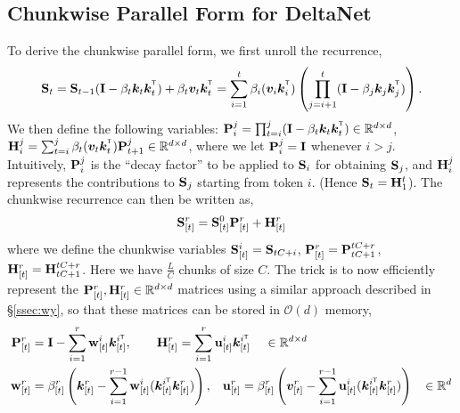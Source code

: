 \subsection{Chunkwise Parallel Form for DeltaNet}
\label{sec:chunk_deltanet}
\vspace{-2mm}
To derive the chunkwise parallel form, we first unroll the recurrence, 
\begin{align}
  \rmS_t 
   = \rmS_{t-1} (\rmI - \beta_t \vk_t \vk_t^\intercal) + \beta_t \vv_t  \vk_t^\intercal 
  = \sum_{i=1}^t  \beta_i (\vv_i \vk_i^\intercal) \left( \prod_{j=i+1}^t  (\rmI - \beta_j \vk_j \vk_j^\intercal) \right). 
\label{eq:unroll}
\end{align}
We then define the following variables: 
$\rmP_{i}^{j} =  \prod_{t=i}^j  (\rmI - \beta_t \vk_t \vk_t^\intercal)  \in \R^{d \times d}$,  $\rmH_{i}^{j} = \sum_{t=i}^j  \beta_t (\vv_t \vk_t^\intercal) \rmP_{t+1}^{j} \in \R^{d \times d}$, where we let ${\mathbf{P}}_{i}^j = {\mathbf{I}}$ whenever $i > j$. Intuitively, ${\mathbf{P}}_{i}^{j}$ is the ``decay factor'' to be applied to ${\mathbf{S}}_{i}$ for obtaining ${\mathbf{S}}_{j}$, and  ${\mathbf{H}}_{i}^{j}$ represents the   contributions to ${\mathbf{S}}_j$ starting from token $i$. (Hence ${\mathbf{S}}_{t} = {\mathbf{H}}_{1}^t$). The chunkwise recurrence  can then  be written as,
\begin{align}
    {\mathbf{S}}_{[t]}^{r} = {\mathbf{S}}_{[t]}^0 {\mathbf{P}}_{[t]}^{r} + {\mathbf{H}}_{[t]}^{r} 
     \label{eq:delta_chunk}
\end{align}
 where we define the chunkwise variables  ${\mathbf{S}}_{[t]}^i = {\mathbf{S}}_{tC + i}$,  $ {\mathbf{P}}_{[t]}^{r} = {\mathbf{P}}_{tC+1}^{tC+r}$, ${\mathbf{H}}_{[t]}^{r} ={\mathbf{H}}_{tC+1}^{tC+r}$.  Here we have $\frac{L}{C}$ chunks of size $C$. 
%
The trick is to now efficiently represent the ${\mathbf{P}}_{[t]}^r, {\mathbf{H}}_{[t]}^r \in \mathbb{R}^{d \times d}$ matrices using a similar approach described in \S\ref{ssec:wy}, so that these matrices can be stored in $\mathcal{O}(d)$ memory,
\begin{align}
    \rmP_{[t]}^{r} &= \rmI - \sum_{i=1}^{r}\vw_{[t]}^i\vk_{[t]}^{i\intercal}  ,\qquad \rmH_{[t]}^{r} = \sum_{i=1}^{r} \vu_{[t]}^i \vk_{[t]}^{i\intercal} \hspace{4mm} \in \R^{d \times d} \label{eq:wy-ph} \\
    \vw_{[t]}^r &= \beta_{[t]}^r \left(\vk_{[t]}^r -  \sum_{i=1}^{r-1} \vw_{[t]}^i (\vk_{[t]}^{i\intercal}\vk_{[t]}^r)  \right), \hspace{3mm}
    \vu_{[t]}^r = \beta_{[t]}^r \left(\vv_{[t]}^r -  \sum_{i=1}^{r-1} \vu_{[t]}^i (\vk_{[t]}^{i\intercal}\vk_{[t]}^r)  \right) \hspace{3mm} \in \R^{d} 
    \label{eq:wy-u}
\end{align}
